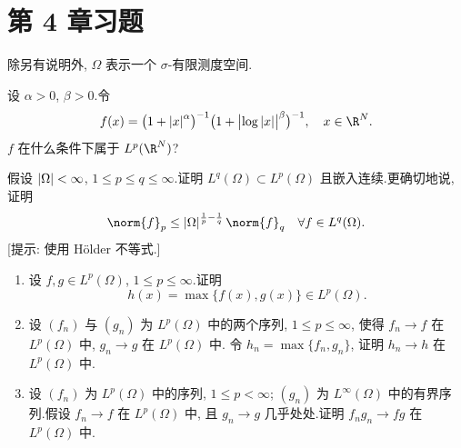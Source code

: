 \section*{第 4 章习题}

除另有说明外, $\Omega$ 表示一个 $\sigma$-有限测度空间.

\begin{exercise}
\label{exer:4.1}
设 $\alpha>0$, $\beta>0$.令
\begin{equation*}
f(x)=\bigl(1+\abs{x}^\alpha\bigr)^{-1}
\bigl(1+\bigl|\log\abs{x}\bigr|^\beta\bigr)^{-1},\quad x\in\R^N.
\end{equation*}
$f$ 在什么条件下属于 $L^p(\R^N)$?
\end{exercise}

\begin{exercise}
\label{exer:4.2}
假设 $\left|\Omega\right|<\infty$, $1\le p\le q\le\infty$.证明 $L^q(\Omega)\subset
L^p(\Omega)$ 且嵌入连续.更确切地说, 证明
\begin{equation*}
\norm{f}_p\le\abs{\Omega}^{\frac1p-\frac1q}\norm{f}_q\quad\forall f\in L^q(\Omega).
\end{equation*}
[提示: 使用 Hölder 不等式.]
\end{exercise}

\begin{exercise}
\label{exer:4.3}
\begin{enumerate}[label=\arabic*., leftmargin=2.2em, itemsep=0.35em]
	\item 设 $f,g\in L^p(\Omega)$, $1\le p\le\infty$.证明
	      \begin{equation*}
	      h(x)=\max\{f(x),g(x)\}\in L^p(\Omega).
	      \end{equation*}
	\item 设 $(f_n)$ 与 $(g_n)$ 为 $L^p(\Omega)$ 中的两个序列, $1\le p\le\infty$,
	      使得 $f_n\to f$ 在 $L^p(\Omega)$ 中, $g_n\to g$ 在 $L^p(\Omega)$ 中.
	      令 $h_n=\max\{f_n,g_n\}$, 证明 $h_n\to h$ 在 $L^p(\Omega)$ 中.
	\item 设 $(f_n)$ 为 $L^p(\Omega)$ 中的序列, $1\le p<\infty$; $(g_n)$ 为
	      $L^\infty(\Omega)$ 中的有界序列.假设 $f_n\to f$ 在 $L^p(\Omega)$ 中,
	      且 $g_n\to g$ 几乎处处.证明 $f_ng_n\to fg$ 在 $L^p(\Omega)$ 中.
\end{enumerate}
\end{exercise}

